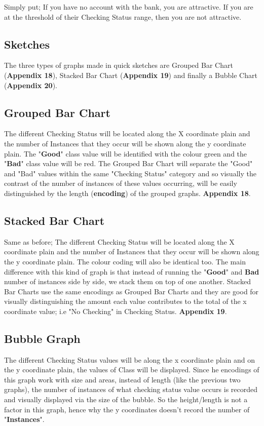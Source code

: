 \documentclass[12pt, a4paper]{article}
\begin{document}
    Simply put; If you have no account with the bank, you are attractive. If you are at the threshold of their Checking Status range, then you are not attractive.
    
    \subsection{Sketches}
    The three types of graphs made in quick sketches are Grouped Bar Chart (\textbf{Appendix 18}), Stacked Bar Chart (\textbf{Appendix 19}) and finally a Bubble Chart (\textbf{Appendix 20}).
    
    \subsection{Grouped Bar Chart}
    The different Checking Status will be located along the X coordinate plain and the number of Instances that they occur will be shown along the y coordinate plain. The "\textbf{Good}" class value will be identified with the colour green and the "\textbf{Bad}" class value will be red. The Grouped Bar Chart will separate the "Good" and "Bad" values within the same "Checking Status" category and so visually the contrast of the number of instances of these values occurring, will be easily distinguished by the length (\textbf{encoding}) of the grouped graphs. \textbf{Appendix 18}.
    
    \subsection{Stacked Bar Chart}
    Same as before; The different Checking Status will be located along the X coordinate plain and the number of Instances that they occur will be shown along the y coordinate plain. The colour coding will also be identical too. The main difference with this kind of graph is that instead of running the "\textbf{Good}" and \textbf{Bad} number of instances side by side, we stack them on top of one another. Stacked Bar Charts use the same encodings as Grouped Bar Charts and they are good for visually distinguishing the amount each value contributes to the total of the x coordinate value; i.e "No Checking" in Checking Status. \textbf{Appendix 19}.
    
    \subsection{Bubble Graph}
    The different Checking Status values will be along the x coordinate plain and on the y coordinate plain, the values of Class will be displayed. Since he encodings of this graph work with size and areas, instead of length (like the previous two graphs), the number of instances of what checking status value occurs is recorded and visually displayed via the size of the bubble. So the height/length is not a factor in this graph, hence why the y coordinates doesn't record the number of "\textbf{Instances}".
    
\end{document}
